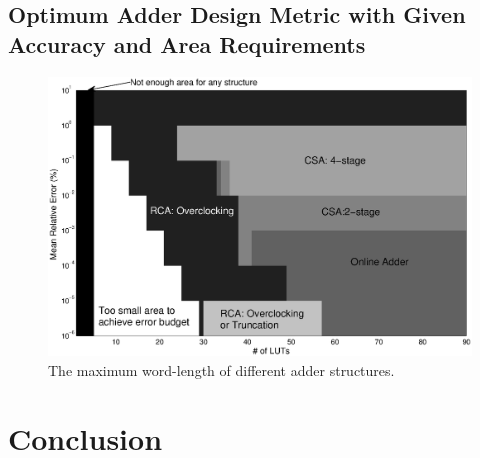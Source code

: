 \documentclass[10pt, conference, compsocconf]{IEEEtran}
\begin{document}
\subsection{Optimum Adder Design Metric with Given Accuracy and Area Requirements}
%
\begin{figure}[tbp]
  \centering
  \includegraphics[width=.8\textwidth]{./figures/exp/3d_ErrorArea.eps}
  \caption{The maximum word-length of different adder structures.}
  \label{Fig:adder_3d_ErrorArea}
\end{figure}

\section{Conclusion}\label{sec:conclusion}






\end{document}
